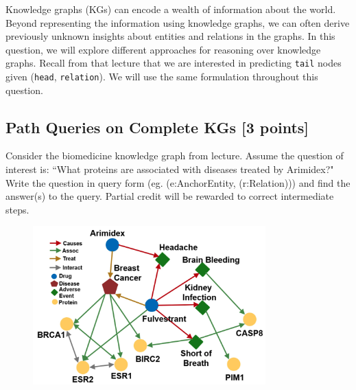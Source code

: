 \documentclass{article}
\numberwithin{figure}{section}
\begin{document}
Knowledge graphs (KGs) can encode a wealth of information about the world. Beyond representing the information using knowledge graphs, we can often derive previously unknown insights about entities and relations in the graphs. In this question, we will explore different approaches for reasoning over knowledge graphs. Recall from that lecture that we are interested in predicting \texttt{tail} nodes given (\texttt{head}, \texttt{relation}). We will use the same formulation throughout this question.


\subsection{Path Queries on Complete KGs [3 points]}
Consider the biomedicine knowledge graph from lecture. Assume the question of interest is: ``What proteins are associated with diseases treated by Arimidex?" Write the question in query form (eg. (e:AnchorEntity, (r:Relation))) and find the answer(s) to the query. Partial credit will be rewarded to correct intermediate steps.

\begin{figure}[H]
    \centering
    \includegraphics[width=0.8\textwidth]{5.1.png}
    \label{fig:5.1}
\end{figure}
\end{document}
